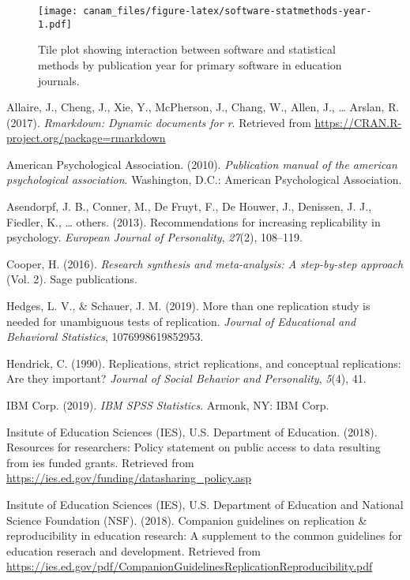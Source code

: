 \documentclass[
  english,
  ,man]{apa6}
\begin{document}
\begin{figure}
\centering
\texttt{[image: canam\_files/figure-latex/software-statmethods-year-1.pdf]}
\caption{\label{fig:software-statmethods-year}Tile plot showing interaction between software and statistical methods by publication year for primary software in education journals.}
\end{figure}

\hypertarget{refs}{}
\leavevmode\hypertarget{ref-rmarkdown}{}%
Allaire, J., Cheng, J., Xie, Y., McPherson, J., Chang, W., Allen, J., \ldots{} Arslan, R. (2017). \emph{Rmarkdown: Dynamic documents for r}. Retrieved from \url{https://CRAN.R-project.org/package=rmarkdown}

\leavevmode\hypertarget{ref-apa}{}%
American Psychological Association. (2010). \emph{Publication manual of the american psychological association}. Washington, D.C.: American Psychological Association.

\leavevmode\hypertarget{ref-asendorpf2013}{}%
Asendorpf, J. B., Conner, M., De Fruyt, F., De Houwer, J., Denissen, J. J., Fiedler, K., \ldots{} others. (2013). Recommendations for increasing replicability in psychology. \emph{European Journal of Personality}, \emph{27}(2), 108--119.

\leavevmode\hypertarget{ref-cooper2016}{}%
Cooper, H. (2016). \emph{Research synthesis and meta-analysis: A step-by-step approach} (Vol. 2). Sage publications.

\leavevmode\hypertarget{ref-hedges2019}{}%
Hedges, L. V., \& Schauer, J. M. (2019). More than one replication study is needed for unambiguous tests of replication. \emph{Journal of Educational and Behavioral Statistics}, 1076998619852953.

\leavevmode\hypertarget{ref-hendrick1990}{}%
Hendrick, C. (1990). Replications, strict replications, and conceptual replications: Are they important? \emph{Journal of Social Behavior and Personality}, \emph{5}(4), 41.

\leavevmode\hypertarget{ref-spss}{}%
IBM Corp. (2019). \emph{IBM SPSS Statistics}. Armonk, NY: IBM Corp.

\leavevmode\hypertarget{ref-iesdata}{}%
Insitute of Education Sciences (IES), U.S. Department of Education. (2018). Resources for researchers: Policy statement on public access to data resulting from ies funded grants. Retrieved from \url{https://ies.ed.gov/funding/datasharing_policy.asp}

\leavevmode\hypertarget{ref-iesrepro}{}%
Insitute of Education Sciences (IES), U.S. Department of Education and National Science Foundation (NSF). (2018). Companion guidelines on replication \& reproducibility in education research: A supplement to the common guidelines for education reserach and development. Retrieved from \url{https://ies.ed.gov/pdf/CompanionGuidelinesReplicationReproducibility.pdf}
\end{document}
